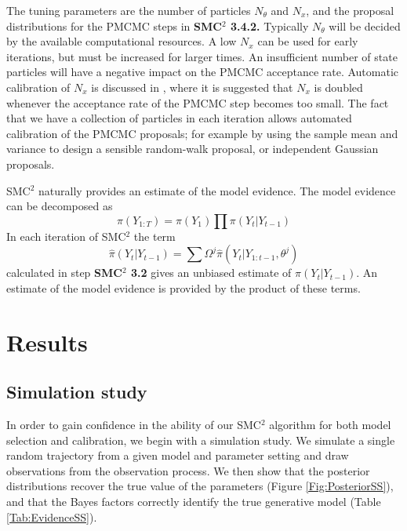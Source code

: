 \documentclass[a4paper,12pt]{article}
\begin{document}
\noindent The tuning parameters are the number of particles $N_\theta$ and $N_x$, and the proposal distributions for the PMCMC steps in {\bf SMC$^2$ 3.4.2.} Typically $N_\theta$ will be decided by the available computational resources.
A low $N_x$ can be used for early iterations, but must be increased for larger times.
An insufficient number of state particles will have a negative impact on the PMCMC acceptance rate.
Automatic calibration of $N_x$ is discussed in \cite{Chopin2012}, where it is suggested that $N_x$ is doubled whenever the acceptance rate of the PMCMC step becomes too small.
The fact that we have a collection of particles in each iteration allows automated calibration of the PMCMC proposals; for example by using the sample mean and variance to design a sensible random-walk proposal, or independent Gaussian proposals.

SMC$^2$ naturally provides an estimate of the model evidence.
The model evidence can be decomposed as 
\begin{equation}
\pi(Y_{1:T}) = \pi(Y_1) \prod \pi(Y_t \vert Y_{t-1})
\end{equation}
\noindent In each iteration of SMC$^2$ the term 
\[ \hat{\pi}(Y_t \vert Y_{t-1}) = \sum \Omega^j \hat{\pi} (Y_t \vert Y_{1:t-1}, \theta^j) \]
\noindent calculated in step {\bf SMC$^2$ 3.2} gives an unbiased estimate of $\pi(Y_t \vert Y_{t-1})$.
An estimate of the model evidence is provided by the product of these terms.


\clearpage
\section{Results}
\label{Sec:Results}




\subsection{Simulation study}
In order to gain confidence in the ability of our SMC$^2$ algorithm for both model selection and calibration, we begin with a simulation study.
We simulate a single random trajectory from a given model and parameter setting and draw observations from the observation process. We then show that the posterior distributions recover the true value of the parameters (Figure \ref{Fig:PosteriorSS}), and that the Bayes factors correctly identify the true generative model (Table \ref{Tab:EvidenceSS}).
\end{document}
